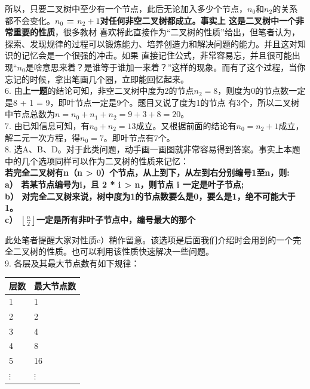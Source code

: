 所以，只要二叉树中至少有一个节点，此后无论加入多少个节点，\(n_0\)和\(n_2\)的关系都不会变化。\textbf{\(n_0\) = \(n_2+1\)对任何非空二叉树都成立。事实上
这是二叉树中一个非常重要的性质}，很多教材
喜欢将此直接作为“二叉树的性质”给出，但笔者认为，探索、发现规律的过程可以锻炼能力、培养创造力和解决问题的能力。并且这对知识的记忆会是一个很强的冲击。如果
直接记住公式，非常容易忘，并且很可能出现“\(n_0\)是啥意思来着？是谁等于谁加一来着？”这样的现象。而有了这个过程，当你忘记的时候，拿出笔画几个圈，立即能回忆起来。\\

6. 由{\color{red}\textbf{上一题}}的结论可知，非空二叉树中度为2的节点\(n_2 = 8\)，则度为0的节点数一定是8 + 1 = 9，即叶节点一定是9个。题目又说了度为1的节点
有3个，所以二叉树中节点总数为\(n = n_0 + n_1 + n_2 = 9 + 3 + 8 = 20\)。\\

7. 由已知信息可知，有\(n_0 + n_2 = 13\)成立。又根据前面的结论有\(n_0 = n_2 + 1\)成立，解二元一次方程，得\(n_0 = 7\)。即叶节点有7个。\\

8. 选A、B、D。对于此类问题，动手画一画图就非常容易得到答案。事实上本题中的几个选项同样可以作为二叉树的性质来记忆：\\
\textbf{若完全二叉树有n（n > 0）个节点，从上到下，从左到右分别编号1至n，则:\\
a） 若某节点编号为i，且 2 * i > n，则节点 i 一定是叶子节点;\\
b） 对完全二叉树来说，树中度为1的节点数要么是0，要么是1，绝不可能大于1。\\
c） $\left\lfloor \frac{n}{2} \right\rfloor $一定是所有非叶子节点中，编号最大的那个\\}

此处笔者提醒大家对性质c）稍作留意。该选项是后面我们介绍时会用到的一个完全二叉树的性质。也可以利用该性质快速解决一些问题。\\

9. 各层及其最大节点数有如下规律：\\
\begin{center}
    \begin{tabular}{|l|l|}
        \hline
        层数 & 最大节点数 \\
        \hline
        1 & 1 \\
        \hline
        2 & 2 \\
        \hline
        3 & 4 \\
        \hline
        4 & 8 \\
        \hline
        5 & 16 \\
        \hline
        $\vdots$ & $\vdots$ \\
        \hline
    \end{tabular}
\end{center}

